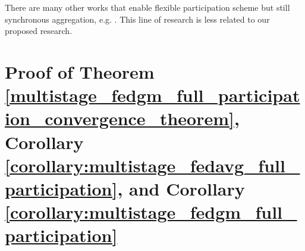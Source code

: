 There are many other works that enable flexible participation scheme but still synchronous aggregation, e.g. \citep{Yan2020DistributedClient, gu2021arbitraryunavailable,wang2022arbitraryparticipation, Nishio2018ClientSelection, Chen2020ClientSampling, cho22biased_selection, Goetz2019ActiveFL,Ribero2020clientsampling}. This line of research is less related to our proposed research. 



\section{Proof of Theorem \ref{multistage_fedgm_full_participation_convergence_theorem}, Corollary \ref{corollary:multistage_fedavg_full_participation}, and Corollary \ref{corollary:multistage_fedgm_full_participation}}
\label{sec:proof_multistage_fedgm_full_participation}


